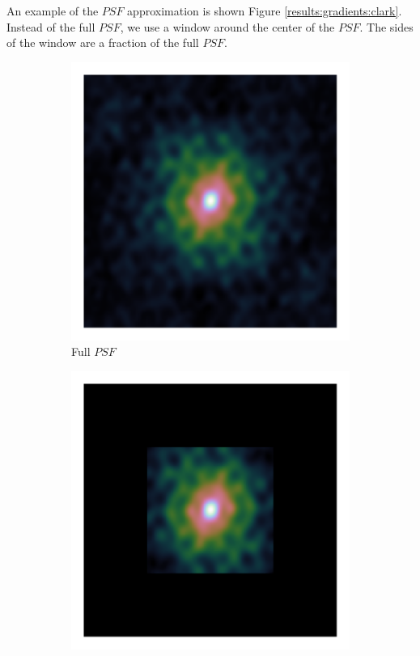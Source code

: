 An example of the $PSF$ approximation is shown Figure \ref{results:gradients:clark}. Instead of the full $PSF$, we use a window around the center of the $PSF$. The sides of the window are a fraction of the full $PSF$.
\begin{figure}[h]
	\centering
	\begin{subfigure}[b]{0.245\linewidth}
		\includegraphics[width=\linewidth, clip, trim= 0.25in 0.25in 0.25in 0.25in]{./chapters/03.cd/simulated/psf.png}
		\caption{Full $PSF$}
	\end{subfigure}
	\begin{subfigure}[b]{0.245\linewidth}
		\includegraphics[width=\linewidth, clip, trim= 0.25in 0.25in 0.25in 0.25in]{./chapters/03.cd/simulated/psfCut.png}

\end{subfigure}
\end{figure}
